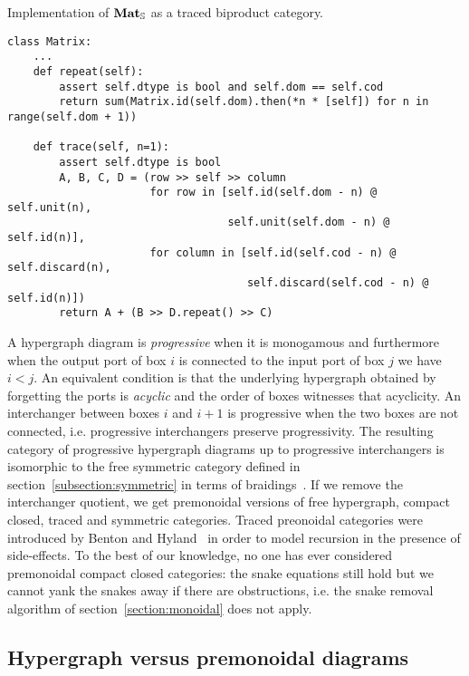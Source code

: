 \begin{python}\label{listing:traced-matrix}
{\normalfont Implementation of $\mathbf{Mat}_\S$ as a traced biproduct category.}

\begin{verbatim}
class Matrix:
    ...
    def repeat(self):
        assert self.dtype is bool and self.dom == self.cod
        return sum(Matrix.id(self.dom).then(*n * [self]) for n in range(self.dom + 1))

    def trace(self, n=1):
        assert self.dtype is bool
        A, B, C, D = (row >> self >> column
                      for row in [self.id(self.dom - n) @ self.unit(n),
                                  self.unit(self.dom - n) @ self.id(n)],
                      for column in [self.id(self.cod - n) @ self.discard(n),
                                     self.discard(self.cod - n) @ self.id(n)])
        return A + (B >> D.repeat() >> C)
\end{verbatim}
\end{python}

A hypergraph diagram is \emph{progressive} when it is monogamous and furthermore when the output port of box $i$ is connected to the input port of box $j$ we have $i < j$.
An equivalent condition is that the underlying hypergraph obtained by forgetting the ports is \emph{acyclic} and the order of boxes witnesses that acyclicity.
An interchanger between boxes $i$ and $i + 1$ is progressive when the two boxes are not connected, i.e. progressive interchangers preserve progressivity.
The resulting category of progressive hypergraph diagrams up to progressive interchangers is isomorphic to the free symmetric category defined in section~\ref{subsection:symmetric} in terms of braidings~\cite[Theorem~3.12]{BonchiEtAl16}.
If we remove the interchanger quotient, we get premonoidal versions of free hypergraph, compact closed, traced and symmetric categories.
Traced preonoidal categories were introduced by Benton and Hyland~\cite{BentonHyland03} in order to model recursion in the presence of side-effects.
To the best of our knowledge, no one has ever considered premonoidal compact closed categories: the snake equations still hold but we cannot yank the snakes away if there are obstructions, i.e. the snake removal algorithm of section~\ref{section:monoidal} does not apply.

\subsection{Hypergraph versus premonoidal diagrams}\label{subsection:hypergraph-vs-premonoidal}

